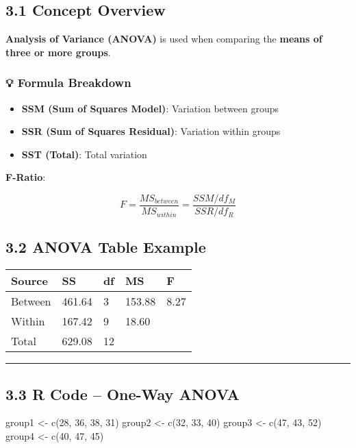 \documentclass[
  letterpaper,
  DIV=11,
  numbers=noendperiod]{scrreprt}
\providecommand{\tightlist}{%
  \setlength{\itemsep}{0pt}\setlength{\parskip}{0pt}}
\begin{document}
\subsection{3.1 Concept Overview}\label{concept-overview}

\textbf{Analysis of Variance (ANOVA)} is used when comparing the
\textbf{means of three or more groups}.

\subsubsection{💡 Formula Breakdown}\label{formula-breakdown}

\begin{itemize}
\tightlist
\item
  \textbf{SSM (Sum of Squares Model)}: Variation between groups
\item
  \textbf{SSR (Sum of Squares Residual)}: Variation within groups
\item
  \textbf{SST (Total)}: Total variation
\end{itemize}

\textbf{F-Ratio}:

\[
F = \frac{MS_{between}}{MS_{within}} = \frac{SSM / df_M}{SSR / df_R}
\]

\subsection{3.2 ANOVA Table Example}\label{anova-table-example}

\begin{longtable}[]{@{}lllll@{}}
\toprule\noalign{}
Source & SS & df & MS & F \\
\midrule\noalign{}
\endhead
\bottomrule\noalign{}
\endlastfoot
Between & 461.64 & 3 & 153.88 & 8.27 \\
Within & 167.42 & 9 & 18.60 & \\
Total & 629.08 & 12 & & \\
\end{longtable}

\begin{center}\rule{0.5\linewidth}{0.5pt}\end{center}

\subsection{3.3 R Code -- One-Way ANOVA}\label{r-code-one-way-anova}

group1 \textless- c(28, 36, 38, 31) group2 \textless- c(32, 33, 40)
group3 \textless- c(47, 43, 52) group4 \textless- c(40, 47, 45)
\end{document}
